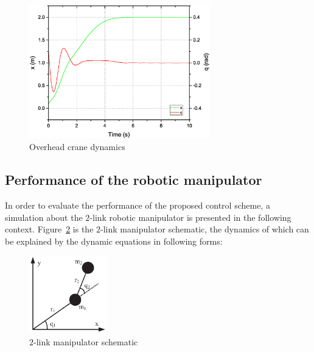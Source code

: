 \documentclass[3p]{elsarticle}
\theoremstyle{plain}
\theoremstyle{remark}
\begin{document}
\begin{figure}
\centering
\includegraphics[width=0.7\textwidth]{paper3_fig9.eps}
\caption{Overhead crane dynamics}
\label{Figure:9}
\end{figure}
\subsection{Performance of the robotic manipulator}\label{sec:robotica manipulator}
In order to evaluate the performance of the proposed control scheme, a simulation about the $2$-link robotic manipulator is presented in the following context. Figure~\ref{Figure:1} is the $2$-link manipulator schematic, the dynamics of which can be explained by the dynamic equations in following forms:
\begin{figure}
\centering
\includegraphics[width=0.3\textwidth]{paper3_fig1.eps}
\caption{$2$-link manipulator schematic}
\label{Figure:1}
\end{figure}
\end{document}
